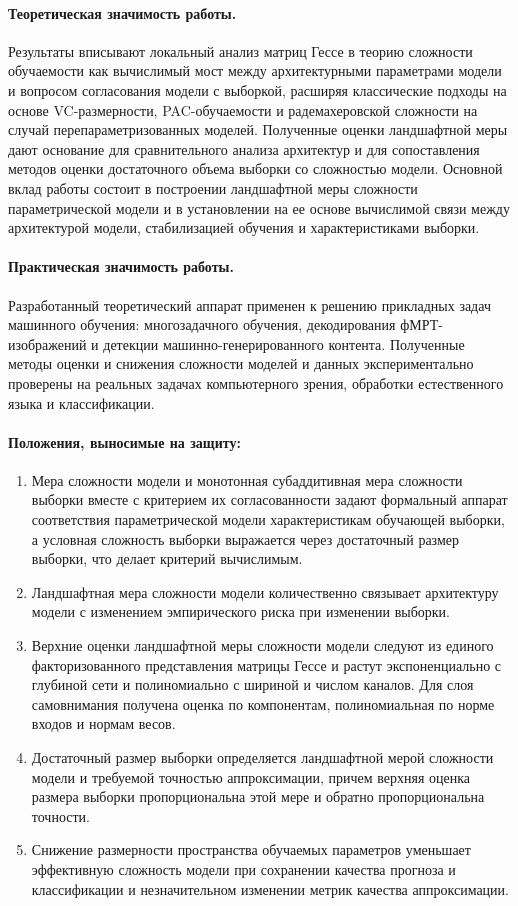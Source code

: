 \paragraph{Теоретическая значимость работы.}
Результаты вписывают локальный анализ матриц Гессе в теорию сложности обучаемости как вычислимый мост между архитектурными параметрами модели и вопросом согласования модели с выборкой, расширяя классические подходы на основе VC-размерности, PAC-обучаемости и радемахеровской сложности на случай перепараметризованных моделей.
Полученные оценки ландшафтной меры дают основание для сравнительного анализа архитектур и для сопоставления методов оценки достаточного объема выборки со сложностью модели.
Основной вклад работы состоит в построении ландшафтной меры сложности параметрической модели и в установлении на ее основе вычислимой связи между архитектурой модели, стабилизацией обучения и характеристиками выборки.

\paragraph{Практическая значимость работы.}
Разработанный теоретический аппарат применен к решению прикладных задач машинного обучения: многозадачного обучения, декодирования фМРТ-изображений и детекции машинно-генерированного контента.
Полученные методы оценки и снижения сложности моделей и данных экспериментально проверены на реальных задачах компьютерного зрения, обработки естественного языка и классификации.

\paragraph{Положения, выносимые на защиту:}
\begin{enumerate}
    \item Мера сложности модели и монотонная субаддитивная мера сложности выборки вместе с критерием их согласованности задают формальный аппарат соответствия параметрической модели характеристикам обучающей выборки, а условная сложность выборки выражается через достаточный размер выборки, что делает критерий вычислимым.
    \item Ландшафтная мера сложности модели количественно связывает архитектуру модели с изменением эмпирического риска при изменении выборки.
    \item Верхние оценки ландшафтной меры сложности модели следуют из единого факторизованного представления матрицы Гессе и растут экспоненциально с глубиной сети и полиномиально с шириной и числом каналов. Для слоя самовнимания получена оценка по компонентам, полиномиальная по норме входов и нормам весов.
    \item Достаточный размер выборки определяется ландшафтной мерой сложности модели и требуемой точностью аппроксимации, причем верхняя оценка размера выборки пропорциональна этой мере и обратно пропорциональна точности.
    \item Снижение размерности пространства обучаемых параметров уменьшает эффективную сложность модели при сохранении качества прогноза и классификации и незначительном изменении метрик качества аппроксимации.
\end{enumerate}

